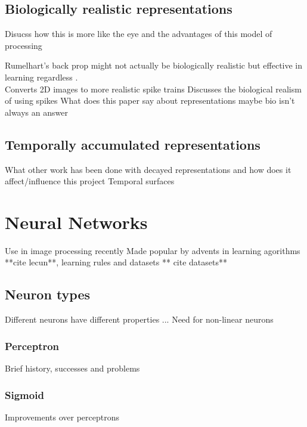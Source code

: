 \subsection{Biologically realistic representations}
% 
Disucss how this is more like the eye and the advantages of this model of processing \cite{mahowald1992vlsi}

Rumelhart's back prop might not actually be biologically realistic but effective in learning regardless \cite{Rumelhart1986}. \\
Converts 2D images to more realistic spike trains \cite{afshar2013ripple}
Discusses the biological realism of using spikes \cite{akolkar2015can}
What does this paper say about representations maybe bio isn't always an answer \cite{fida2015pre}

\pagebreak
\subsection{Temporally accumulated representations}  %
What other work has been done with decayed representations and how does it affect/influence this project
Temporal surfaces \cite{afshar2016investigation}




\pagebreak
\section{Neural Networks}     %
Use in image processing recently
Made popular by advents in learning agorithms **cite lecun**, learning rules  \cite{Rumelhart1986} and datasets ** cite datasets**

\subsection{Neuron types}
Different neurons have different properties ...
Need for non-linear neurons

\subsubsection{Perceptron}
Brief history, successes and problems

\subsubsection{Sigmoid}
Improvements over perceptrons

